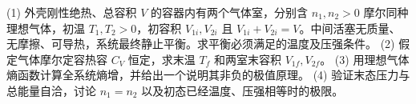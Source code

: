 (1) 外壳刚性绝热、总容积 \(V\) 的容器内有两个气体室，分别含 \(n_1,n_2>0\) 摩尔同种理想气体，初温 \(T_1,T_2>0\)，初容积 \(V_{1i},V_{2i}\) 且 \(V_{1i}+V_{2i}=V\)。中间活塞无质量、无摩擦、可导热，系统最终静止平衡。求平衡必须满足的温度及压强条件。
(2) 假定气体摩尔定容热容 \(C_V\) 恒定，求末温 \(T_f\) 和两室末容积 \(V_{1f},V_{2f}\)。
(3) 用理想气体熵函数计算全系统熵增，并给出一个说明其非负的极值原理。
(4) 验证末态压力与总能量自洽，讨论 \(n_1=n_2\) 以及初态已经温度、压强相等时的极限。
